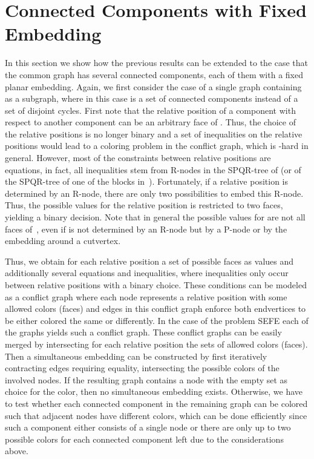 \documentclass{scrartcl}
\newcommand{\1}[1]{{\normalfont \ensuremath{#1^{\tiny\circled{1}}}}} \newcommand{\2}[1]{{\normalfont \ensuremath{#1^{\tiny\circled{2}}}}} \renewcommand{\k}[1]{{\normalfont \ensuremath{#1^{\tiny\circled{k}}}}} \newcommand{\proj}[2]{\ensuremath{\left.#1\right|_{#2}}} \newcommand{\eps}{\varepsilon}
\theoremstyle{plain} \newtheorem{theorem}{Theorem} \newcounter{lemmacounter} \setcounter{lemmacounter}{0} \newtheorem{lemma}[lemmacounter]{Lemma} \newtheorem{fact}{Fact}  \newtheorem{corollary}{Corollary} \theoremstyle{definition} \newtheorem{definition}{Definition}
\begin{document}
\section{Connected Components with Fixed Embedding}
\label{sec:extension}

In this section we show how the previous results can be extended to
the case that the common graph has several connected components, each
of them with a fixed planar embedding.  Again, we first consider the
case of a single graph  containing  as a subgraph,
where in this case  is a set of connected components
instead of a set of disjoint cycles.  First note that the relative
position  of a component  with respect to another
component  can be an arbitrary face of .  Thus, the choice of
the relative positions is no longer binary and a set of inequalities
on the relative positions would lead to a coloring problem in the
conflict graph, which is -hard in general.  However,
most of the constraints between relative positions are equations, in
fact, all inequalities stem from R-nodes in the SPQR-tree of  (or
of the SPQR-tree of one of the blocks in~).  Fortunately, if a
relative position is determined by an R-node, there are only two
possibilities to embed this R-node.  Thus, the possible values for
the relative position is restricted to two faces, yielding a binary
decision.  Note that in general the possible values for 
are not all faces of~, even if  is not determined by an
R-node but by a P-node or by the embedding around a cutvertex.

Thus, we obtain for each relative position a set of possible faces as
values and additionally several equations and inequalities, where
inequalities only occur between relative positions with a binary
choice.  These conditions can be modeled as a conflict graph where
each node represents a relative position with some allowed colors
(faces) and edges in this conflict graph enforce both endvertices to
be either colored the same or differently.  In the case of the problem
{\sc SEFE} each of the graphs yields such a conflict graph.  These
conflict graphs can be easily merged by intersecting for each relative
position the sets of allowed colors (faces).  Then a simultaneous
embedding can be constructed by first iteratively contracting edges
requiring equality, intersecting the possible colors of the involved
nodes.  If the resulting graph contains a node with the empty set as
choice for the color, then no simultaneous embedding exists.
Otherwise, we have to test whether each connected component in the
remaining graph can be colored such that adjacent nodes have different
colors, which can be done efficiently since such a component either
consists of a single node or there are only up to two possible colors
for each connected component left due to the considerations above.
\end{document}
